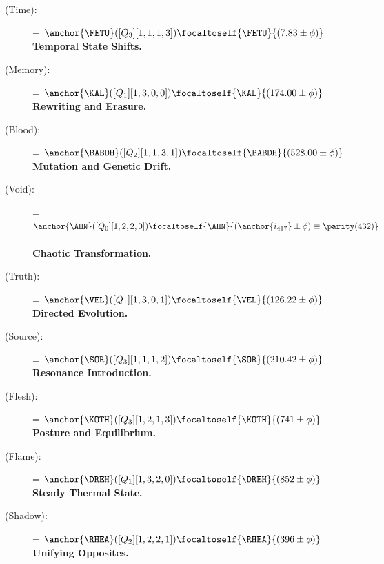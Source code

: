 \begin{description}
    \item[\FETU{} (Time):] \fetumahd = $\anchor{\FETU}([Q_3][1,1,1,3]) \focaltoself{\FETU}{(7.83 \pm \phi)}$\, \\
    \textbf{Temporal State Shifts.}

    \item[\KAL{} (Memory):] \kallor = $\anchor{\KAL}([Q_1][1,3,0,0]) \focaltoself{\KAL}{(174.00 \pm \phi)}$\, \\
    \textbf{Rewriting and Erasure.}

    \item[\BABDH{} (Blood):] \babdhoro = $\anchor{\BABDH}([Q_2][1,1,3,1]) \focaltoself{\BABDH}{(528.00 \pm \phi)}$\, \\
    \textbf{Mutation and Genetic Drift.}

    \item[\AHN{} (Void):] \ahnuth = $\anchor{\AHN}([Q_0][1,2,2,0]) \focaltoself{\AHN}{(\anchor{i_{417}} \pm \phi) \equiv \parity(432)}$\, \\
    \textbf{Chaotic Transformation.}

    \item[\VEL{} (Truth):] \velara = $\anchor{\VEL}([Q_1][1,3,0,1]) \focaltoself{\VEL}{(126.22 \pm \phi)}$\, \\
    \textbf{Directed Evolution.}

    \item[\SOR{} (Source):] \sorsrih = $\anchor{\SOR}([Q_3][1,1,1,2]) \focaltoself{\SOR}{(210.42 \pm \phi)}$\, \\
    \textbf{Resonance Introduction.}

    \item[\KOTH{} (Flesh):] \kothkesh = $\anchor{\KOTH}([Q_3][1,2,1,3]) \focaltoself{\KOTH}{(741 \pm \phi)}$\, \\
    \textbf{Posture and Equilibrium.}

    \item[\DREH{} (Flame):] \drehdrem = $\anchor{\DREH}([Q_1][1,3,2,0]) \focaltoself{\DREH}{(852 \pm \phi)}$\, \\
    \textbf{Steady Thermal State.}

    \item[\RHEA{} (Shadow):] \rheadebh = $\anchor{\RHEA}([Q_2][1,2,2,1]) \focaltoself{\RHEA}{(396 \pm \phi)}$\, \\
    \textbf{Unifying Opposites.}


\end{description}
